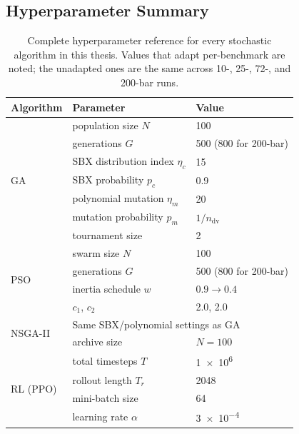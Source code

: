 \subsection{Hyperparameter Summary}
\label{sec:method:hparams}

\begin{table}[h]
  \centering
  \small
  \caption{Complete hyperparameter reference for every stochastic
    algorithm in this thesis. Values that adapt per-benchmark are
    noted; the unadapted ones are the same across 10-, 25-, 72-,
    and 200-bar runs.}
  \label{tab:method:hparams}
  \begin{tabular}{@{}l l l@{}}
    \toprule
    Algorithm & Parameter & Value \\
    \midrule
    \multirow{7}{*}{GA}
      & population size $N$                 & \num{100} \\
      & generations $G$                     & \num{500} (\num{800} for 200-bar) \\
      & SBX distribution index $\eta_c$     & \num{15} \\
      & SBX probability $p_c$               & \num{0.9} \\
      & polynomial mutation $\eta_m$        & \num{20} \\
      & mutation probability $p_m$          & $1/n_{\mathrm{dv}}$ \\
      & tournament size                     & \num{2} \\
    \midrule
    \multirow{4}{*}{PSO}
      & swarm size $N$                      & \num{100} \\
      & generations $G$                     & \num{500} (\num{800} for 200-bar) \\
      & inertia schedule $w$                & $\num{0.9}\to\num{0.4}$ \\
      & $c_1$, $c_2$                        & \num{2.0}, \num{2.0} \\
    \midrule
    \multirow{2}{*}{NSGA-II}
      & \multicolumn{2}{l}{Same SBX/polynomial settings as GA} \\
      & archive size                        & $N=\num{100}$ \\
    \midrule
    \multirow{6}{*}{RL (PPO)}
      & total timesteps $T$                 & \num{1e6} \\
      & rollout length $T_r$                & \num{2048} \\
      & mini-batch size                     & \num{64} \\
      & learning rate $\alpha$              & \num{3e-4} \\

\end{tabular}
\end{table}
